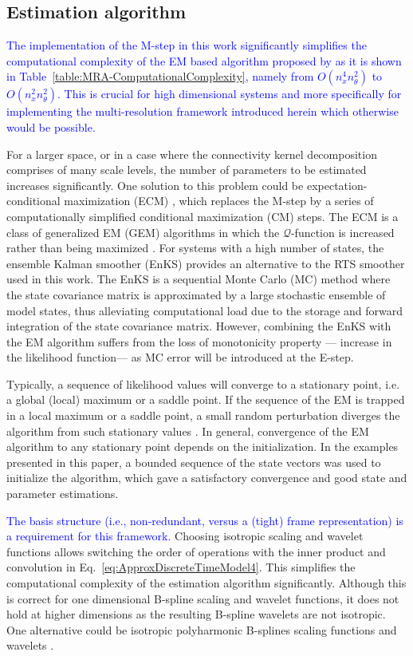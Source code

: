 \documentclass[review,authoryear,3p]{elsarticle}
\newcommand{\parham}[1]{\textcolor{blue}{#1}}
\begin{document}
\subsection{Estimation algorithm}
\parham{The implementation of the M-step in this work significantly simplifies the computational complexity of the EM based algorithm proposed by \cite{Dewar2009} as it is shown in Table~\ref{table:MRA-ComputationalComplexity}, namely from $O(n_x^4n_{\theta}^2)$ to $O(n_x^2n_{\theta}^2)$. This is crucial for high dimensional systems and more specifically for implementing the multi-resolution framework introduced herein which otherwise would be possible.} 

For a larger space, or in a case where the connectivity kernel decomposition comprises of  many scale levels, the number of parameters to be estimated increases significantly. One solution to this problem could be expectation-conditional maximization (ECM) \citep{Meng1993,Meng1994}, which replaces the M-step by a series of computationally simplified conditional maximization (CM) steps. The ECM is a class of generalized EM (GEM)  algorithms in which the $\mathcal{Q}$-function is increased rather than being maximized \citep{Fessler1994}. For systems with a high number of states, the ensemble Kalman smoother (EnKS) \citep{Evensen2003,Evensen2009a,Evensen2009} provides an alternative to the RTS smoother used in this work. The EnKS is a sequential Monte Carlo (MC) method where the state covariance matrix is approximated by a large stochastic ensemble of model states, thus alleviating computational load due to the storage and forward integration of the state covariance matrix. However, combining the EnKS with the EM algorithm suffers from the loss of monotonicity property --- increase in the likelihood function--- as MC error will be introduced at the E-step.

Typically, a sequence of likelihood values will converge to a stationary point, i.e. a global (local) maximum or a saddle point. If the sequence of the EM is trapped in a local maximum or a saddle point, a small random perturbation diverges the algorithm from such stationary values \citep{McLachlan1997}. In general, convergence of the EM algorithm to any stationary point depends on the initialization. In the examples presented in this paper, a bounded sequence of the state vectors was used to initialize the algorithm, which gave a satisfactory convergence and good state and parameter estimations. 

\parham{The basis structure (i.e., non-redundant, versus a (tight) frame representation) is a requirement for this framework.                                              }Choosing isotropic scaling and wavelet functions allows switching the order of operations with the inner product and convolution in Eq.~\eqref{eq:ApproxDiscreteTimeModel4}. This simplifies the computational complexity of the estimation algorithm significantly. Although this is correct for one dimensional B-spline scaling and wavelet functions, it does not hold at higher dimensions as the resulting B-spline wavelets are not isotropic. One alternative could be  
isotropic polyharmonic B-splines scaling functions and wavelets \citep{VanDeVille2005}.
\end{document}
